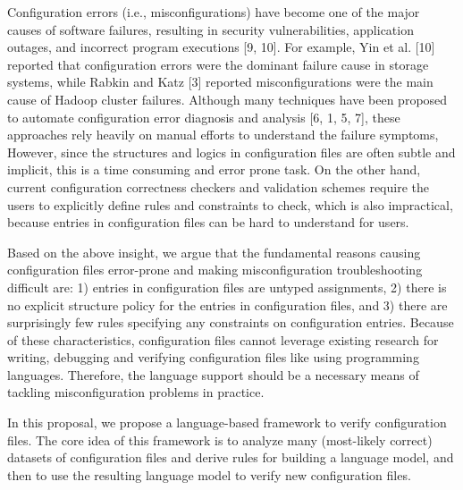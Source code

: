 Configuration errors (i.e., misconfigurations) have become one of the major causes of software failures, resulting in security vulnerabilities, application outages, and incorrect program executions [9, 10]. 
For example, Yin et al. [10] reported that configuration errors were the dominant failure cause in storage systems, while Rabkin and Katz [3] reported  misconfigurations were the main cause of Hadoop cluster failures. 
Although many techniques have been proposed to automate configuration error diagnosis and analysis [6, 1, 5, 7], these approaches rely heavily on manual efforts to understand the failure symptoms, 
However, since the structures and logics in configuration files are often subtle and implicit, this is a time consuming and error prone task.
On the other hand, current configuration correctness checkers and validation schemes require the users to explicitly define rules and constraints to check, which is also impractical, because entries in configuration files can be hard to understand for users.

Based on the above insight, we argue that the fundamental reasons causing configuration files error-prone and making misconfiguration troubleshooting difficult are: 
  1) entries in configuration files are untyped assignments, 
  2) there is no explicit structure policy for the entries in configuration files, and 
  3) there are surprisingly few rules specifying any constraints on configuration entries. 
Because of these characteristics, configuration files cannot leverage existing research for writing, debugging and verifying configuration files like using programming languages. 
Therefore, the language support should be a necessary means of tackling misconfiguration problems in practice.

In this proposal, we propose a language-based framework to verify configuration files. 
The core idea of this framework is to analyze many (most-likely correct) datasets of configuration files and derive rules for building a language model, and then to use the resulting language model to verify new configuration files.

